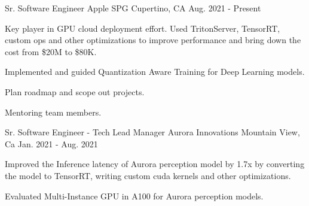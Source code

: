 

\begin{cventries}

  \cventry
    {Sr. Software Engineer} %
    {Apple SPG} %
    {Cupertino, CA} %
    {Aug. 2021 - Present} %
    {
      \begin{cvitems} %
        \item {Key player in GPU cloud deployment effort. Used TritonServer, TensorRT, custom ops and other optimizations to improve performance and bring down the cost from \$20M to \$80K.}
        \item {Implemented and guided Quantization Aware Training for Deep Learning models.}
        \item {Plan roadmap and scope out projects.}
        \item {Mentoring team members.}
      \end{cvitems}
    }

  \cventry
    {Sr. Software Engineer - Tech Lead Manager} %
    {Aurora Innovations} %
    {Mountain View, Ca} %
    {Jan. 2021 - Aug. 2021} %
    {
      \begin{cvitems} %
        \item {Improved the Inference latency of Aurora perception model by 1.7x by converting the model to TensorRT, writing custom cuda kernels and other optimizations.}
        \item {Evaluated Multi-Instance GPU in A100 for Aurora perception models.}
      \end{cvitems}
    }


\end{cventries}
